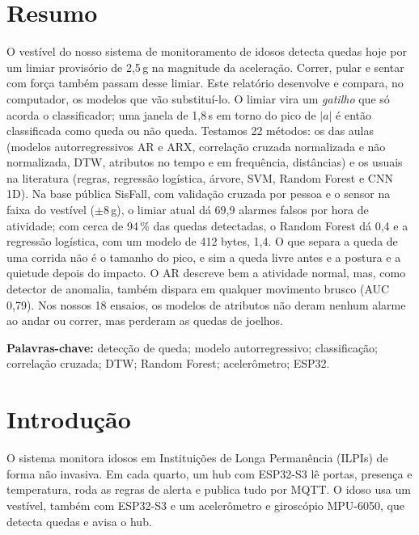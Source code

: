 \documentclass[12pt,a4paper]{article}
\newcommand{\amag}{|a|}
\begin{document}
	\section*{Resumo}
	O vestível do nosso sistema de monitoramento de idosos detecta quedas hoje por um
	limiar provisório de 2,5\,g na magnitude da aceleração. Correr, pular e sentar com
	força também passam desse limiar. Este relatório desenvolve e compara, no
	computador, os modelos que vão substituí-lo. O limiar vira um \emph{gatilho} que
	só acorda o classificador; uma janela de 1,8\,s em torno do pico de $\amag$ é
	então classificada como queda ou não queda. Testamos 22 métodos: os das aulas
	(modelos autorregressivos AR e ARX, correlação cruzada normalizada e não
	normalizada, DTW, atributos no tempo e em frequência, distâncias) e os usuais na
	literatura (regras, regressão logística, árvore, SVM, Random Forest e CNN 1D).
	Na base pública SisFall, com validação cruzada por pessoa e o sensor na faixa do
	vestível ($\pm$8\,g), o limiar atual dá 69,9 alarmes falsos por hora de atividade;
	com cerca de 94\,\% das quedas detectadas, o Random Forest dá 0,4 e a regressão
	logística, com um modelo de 412 bytes, 1,4. O que separa a queda de uma corrida
	não é o tamanho do pico, e sim a queda livre antes e a postura e a quietude
	depois do impacto. O AR descreve bem a atividade normal, mas, como detector de
	anomalia, também dispara em qualquer movimento brusco (AUC 0,79). Nos nossos 18
	ensaios, os modelos de atributos não deram nenhum alarme ao andar ou correr, mas
	perderam as quedas de joelhos.

	{\raggedright
	\textbf{Palavras-chave:} detecção de queda; modelo autorregressivo; classificação;
	correlação cruzada; DTW; Random Forest; acelerômetro; ESP32.\par}

	\newpage
	\tableofcontents
	\thispagestyle{fancy}
	\newpage

\section{Introdução}\label{sec:intro}
O sistema monitora idosos em Instituições de Longa Permanência (ILPIs) de forma não
invasiva. Em cada quarto, um hub com ESP32-S3 lê portas, presença e temperatura, roda
as regras de alerta e publica tudo por MQTT. O idoso usa um vestível, também com
ESP32-S3 e um acelerômetro e giroscópio MPU-6050, que detecta quedas e avisa o hub.
\end{document}
